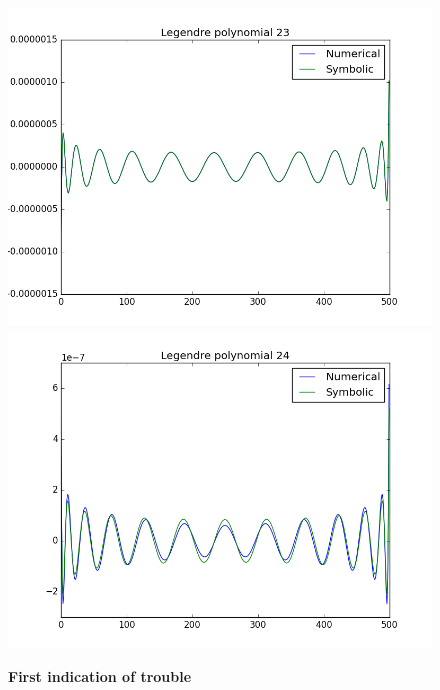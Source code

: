 \documentclass[a4paper,norsk]{article}
\begin{document}
\begin{figure}[!ht]
	\centering
	\caption*{\textbf{First indication of trouble}}
	\includegraphics[scale=0.36]{n23.png}
	\includegraphics[scale=0.36]{n24.png}
\end{figure}

\newpage
\end{document}
